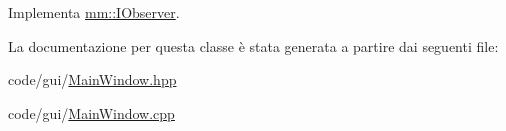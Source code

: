 Implementa \mbox{\hyperlink{classmm_1_1_i_observer_a6422af04f8e9f3ba9d6d412a3bcdd03e}{mm\+::\+I\+Observer}}.



La documentazione per questa classe è stata generata a partire dai seguenti file\+:\begin{DoxyCompactItemize}
\item 
code/gui/\mbox{\hyperlink{_main_window_8hpp}{Main\+Window.\+hpp}}\item 
code/gui/\mbox{\hyperlink{_main_window_8cpp}{Main\+Window.\+cpp}}\end{DoxyCompactItemize}
